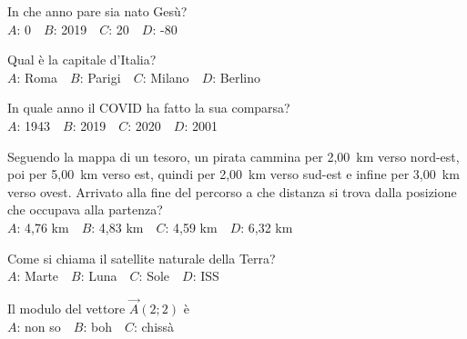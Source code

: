 \def\mcquestionnumber{3}


\mcquestionheader In che anno pare sia nato Gesù?\\
{$A$}: 0\ \ {$B$}: 2019\ \ {$C$}: 20\ \ {$D$}: -80\ \ 

\mcquestionfooter



\def\mcquestionnumber{4}


\mcquestionheader Qual è la capitale d’Italia?\\
{$A$}: Roma\ \ {$B$}: Parigi\ \ {$C$}: Milano\ \ {$D$}: Berlino\ \ 

\mcquestionfooter



\def\mcquestionnumber{5}


\mcquestionheader In quale anno il COVID ha fatto la sua comparsa?\\
{$A$}: 1943\ \ {$B$}: 2019\ \ {$C$}: 2020\ \ {$D$}: 2001\ \ 

\mcquestionfooter



\def\mcquestionnumber{6}


\mcquestionheader Seguendo la mappa di un tesoro, un pirata cammina per 2,00~km verso nord-est, poi per 5,00~km verso est, quindi per 2,00~km verso sud-est e infine per 3,00~km verso ovest. Arrivato alla fine del percorso a che distanza si trova dalla posizione che occupava alla partenza?\\
{$A$}: 4,76 km\ \ {$B$}: 4,83 km\ \ {$C$}: 4,59 km\ \ {$D$}: 6,32 km\ \ 

\mcquestionfooter



\def\mcquestionnumber{7}


\mcquestionheader Come si chiama il satellite naturale della Terra?\\
{$A$}: Marte\ \ {$B$}: Luna\ \ {$C$}: Sole\ \ {$D$}: ISS\ \ 

\mcquestionfooter



\def\mcquestionnumber{8}


\mcquestionheader Il modulo del vettore $\vec{A}(2;2)$ è\\
{$A$}: non so\ \ {$B$}: boh\ \ {$C$}: chissà\ \ 

\mcquestionfooter



\def\mcquestionnumber{9}


